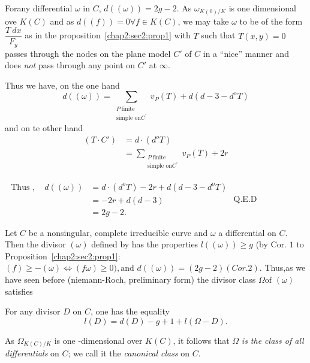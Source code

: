 \begin{corollary}\label{chap2:sec2:coro2}%
  For\pageoriginale any differential $\omega$ in $C$, $d((\omega)) =  2 g -2$. As
  $\omega_{K(0)/K}$ is 
  one dimensional ove $K(C)$ and as $d ((f))= 0  \forall f \in K(C)$,
  we may take $\omega$ to be of the form $\dfrac{ T ~dx}{F_y}$ as in the
  proposition~\ref{chap2:sec2:prop1} with $T$ such that $T(x,y)=0$ passes through the
  nodes on the plane model $C'$ of $C$ in a ``nice'' manner and does
  {\em not} pass through any point on $C'$ at $\infty$. 
\end{corollary}

Thus we have, on the one hand 
$$
d ((\omega))= \underset{\substack{ P ~\text{finite}\\  \text{simple on}
    C^\prime }}{\sum} v_P (T) +d (d-3 -d^o T)  
$$
and on te  other hand
\begin{align*}
  (T \cdot C') & = d\cdot (d^o T)\\
  & = \underset{\substack{ P  ~\text{finite}\\  \text{simple on} C^\prime
  }}{\sum} v_P (T)+2r 
\end{align*}

$\begin{aligned}
  \text{ Thus },\quad d((\omega)) & = d \cdot (d^o T)- 2r+d  (d-3 - d^o T)\\
  & = -2r+d(d-3)\\
  & =  {2g-2}.
\end{aligned}$ \hfill Q.E.D

Let $C$ be a nonsingular, complete  irreducible curve and $\omega$ a
differential on $C$. Then the divisor $(\omega)$ defined by has the
properties $l ((\omega )) \geq g$ (by Cor. $1$ to
Proposition~\ref{chap2:sec2:prop1}:
$(f) \geq - (\omega) \Longleftrightarrow (f \omega) \geq 0), \text{
  and } d (( \omega)) = (2g-2) (Cor.2)$. Thus,\pageoriginale as we have seen before
(niemann-Roch, preliminary form)  the divisor class $  \Omega \text{
  of } (\omega)$ satisfies 

\begin{theorem*}%
  For any divisor $D$ on $C$, one has the equality
  $$ 
  l(D) = d(D)- g+1+l (\Omega-D).
  $$
  
  As $\Omega_{K(C)/K}$ is one -dimensional over $K(C)$, it follows
  that $\Omega$ \textit{is the class of all differentials} on  $C$; we
  call it the \textit{canonical class} on $C$. 
\end{theorem*}


